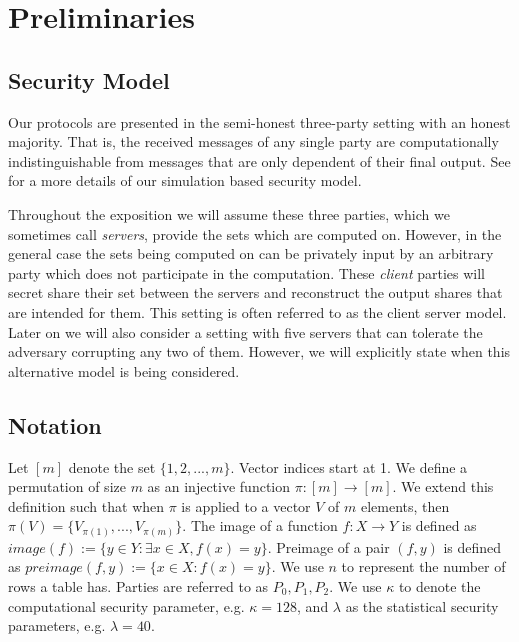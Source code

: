 \section{Preliminaries} \label{sec:prelim}


\subsection{Security Model}

Our protocols are presented in the semi-honest three-party setting with an honest majority. That is, the received messages of any single party are computationally indistinguishable from messages that are only dependent of their final output. See \cite{highthroughput} for a more details of our simulation based security model.


\iffullversion
Throughout the exposition we will assume these three parties, which we sometimes call \emph{servers}, provide the sets which are computed on. However, in the general case the sets being computed on can be privately input by an arbitrary party which does not participate in the computation. These \emph{client} parties will secret share their set between the servers and reconstruct the output shares that are intended for them. This setting is often referred to as the client server model\cite{aby3, secureML}. Later on we will also consider a setting with five servers that can tolerate the adversary corrupting any two of them. However, we will explicitly state when this alternative model is being considered.
\fi


\subsection{Notation}




Let $[m]$ denote the set $\{1,2,...,m\}$. Vector indices start at 1.
We define a permutation of size $m$ as an injective function $\pi : [m] \rightarrow [m]$. We extend this definition such that when $\pi$ is applied to a vector $V$ of $m$ elements, then  $\pi(V)=\{V_{\pi(1)}, ..., V_{\pi(m)}\}$. The image of a function $f : X \rightarrow Y$ is defined as $image(f) := \{y\in Y : \exists x\in X, f(x)=y\}$. Preimage of a pair $(f,y)$ is defined as $preimage(f,y):=\{x\in X : f(x) = y\}$. We use $n$ to represent the number of rows a table has. Parties are referred to as $P_0,P_1,P_{2}$. We use $\kappa$ to denote the computational security parameter, e.g. $\kappa =128$, and $\lambda$ as the statistical security parameters, e.g. $\lambda=40$.

